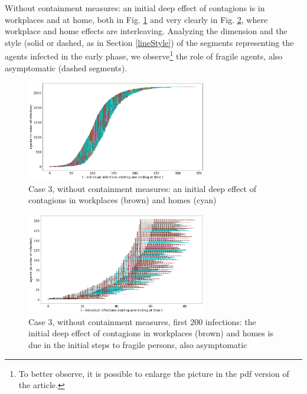 \documentclass[graybox]{svmult}
\begin{document}
Without containment measures: an initial deep effect of contagions is in workplaces and at home, both in Fig. \ref{5a} and very clearly in Fig. \ref{5b}, where workplace and home effects are interleaving. Analyzing the dimension and the style (solid or dashed, as in Section \ref{lineStyle}) of the segments representing the agents infected in the early phase, we observe\footnote{To better observe, it is possible to enlarge the picture in the pdf version of the article.} the role of fragile agents, also asymptomatic (dashed segments).



\begin{figure}[t]
\begin{center}
\includegraphics[width=0.7\textwidth]{no5a.png}%
\caption{Case 3, without containment measures: an initial deep effect of contagions in workplaces (brown) and homes (cyan)}
\label{5a}
\end{center}
\end{figure}

\begin{figure}[t]
\begin{center}
\includegraphics[width=0.7\textwidth]{no5b.png}%
\caption{Case 3, without containment measures, first 200 infections: the initial deep effect of contagions in workplaces (brown) and homes is due in the initial steps to fragile persons, also asymptomatic}
\label{5b}
\end{center}
\end{figure}
\end{document}
